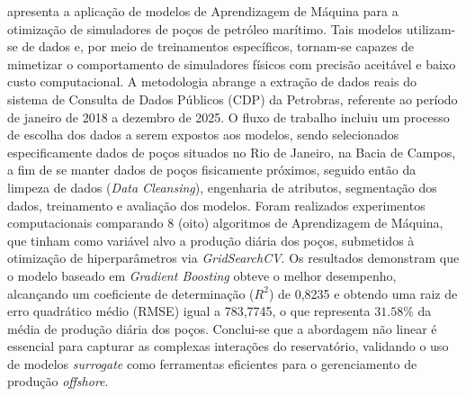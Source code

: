 
 apresenta a aplicação de modelos de Aprendizagem de Máquina para a otimização de simuladores de poços de petróleo marítimo. Tais modelos utilizam-se de dados e, por meio de treinamentos específicos, tornam-se capazes de mimetizar o comportamento de simuladores físicos com precisão aceitável e baixo custo computacional.
A metodologia abrange a extração de dados reais do sistema de Consulta de Dados Públicos (CDP) da Petrobras, referente ao período de janeiro de 2018 a dezembro de 2025. 
O fluxo de trabalho incluiu um processo de escolha dos dados a serem expostos aos modelos, sendo selecionados especificamente dados de poços situados no Rio de Janeiro, na Bacia de Campos, a fim de se manter dados de poços fisicamente próximos, seguido então da limpeza de dados (\textit{Data Cleansing}), engenharia de atributos, segmentação dos dados, treinamento e avaliação dos modelos. 
Foram realizados experimentos computacionais comparando 8 (oito) algoritmos de Aprendizagem de Máquina, que tinham como variável alvo a produção diária dos poços, submetidos à otimização de hiperparâmetros via \textit{GridSearchCV}.
Os resultados demonstram que o modelo baseado em \textit{Gradient Boosting} obteve o melhor desempenho, alcançando um coeficiente de determinação ($R^2$) de 0,8235 e obtendo uma raiz de erro quadrático médio (RMSE) igual a 783,7745, o que representa $31.58\%$ da média de produção diária dos poços.
Conclui-se que a abordagem não linear é essencial para capturar as complexas interações do reservatório, validando o uso de modelos \textit{surrogate} como ferramentas eficientes para o gerenciamento de produção \textit{offshore}.


